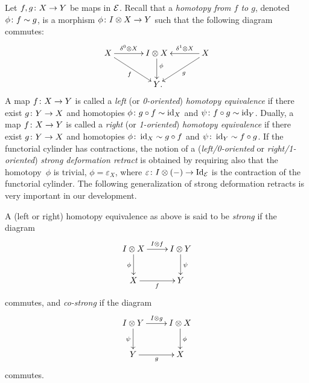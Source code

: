 \documentclass[reqno,10pt,a4paper,oneside,draft]{amsart}
\begin{document}
Let $f, g \colon X \to Y$ be maps in $\mathcal{E}$.
Recall that a \emph{homotopy from $f$ to $g$}, denoted $\phi \colon f \sim g$, is a morphism $\phi \colon I \otimes X \to Y$ such that the following diagram commutes:
\begin{equation} \label{equ:homotopy}
\begin{gathered}
\xymatrix@C=1.2cm{
  X
  \ar[r]^-{\lcyl \otimes X}
  \ar[dr]_{f}
&
  \interval \otimes X
  \ar[d]^(0.4){\phi}
&
  X
  \ar[dl]^{g}
  \ar[l]_-{\rcyl \otimes X}
\\&
  Y
\rlap{.}}
\end{gathered}
\end{equation}
A map $f \colon X \to Y$ is called a \emph{left} (or \emph{0-oriented}) \emph{homotopy equivalence} if there exist $g \colon Y \to X$ and homotopies $\phi \colon g \mathbin{\circ} f \sim \operatorname{id}_X $ and $\psi \colon f \mathbin{\circ} g \sim \operatorname{id}_Y$.
Dually, a map $f \colon X \to Y$ is called a \emph{right} (or \emph{1-oriented}) \emph{homotopy equivalence} if there exist $g \colon Y \to X$ and homotopies $\phi \colon \operatorname{id}_X \sim g \mathbin{\circ} f$ and $\psi \colon \operatorname{id}_Y \sim f \mathbin{\circ} g$.
If the functorial cylinder has contractions, the notion of a (\emph{left/0-oriented} or \emph{right/1-oriented}) \emph{strong deformation retract} is obtained by requiring also that the homotopy~$\phi$ is trivial, \ie $\phi = \varepsilon_X$, where $\varepsilon \colon I \otimes (-)
\to \operatorname{Id}_{\mathcal{E}}$ is the contraction of the functorial cylinder.
The following generalization of strong deformation retracts is very important in our development.

\begin{definition} \label{def:strhe}
A (left or right) homotopy equivalence as above is said to be \emph{strong} if the diagram
\[
\xymatrix{
  \interval \otimes X
  \ar[r]^{\interval \otimes f}
  \ar[d]_{\phi}
&
  \interval \otimes Y
  \ar[d]^{\psi}
\\
  X
  \ar[r]_{f}
&
  Y
}
\]
commutes, and \emph{co-strong} if the diagram
\[
\xymatrix{
  \interval \otimes Y
  \ar[r]^{\interval \otimes g}
  \ar[d]_{\psi}
&
  \interval \otimes X
  \ar[d]^{\phi}
\\
  Y
  \ar[r]_{g}
&
  X
}
\]
commutes.
\end{definition}
\end{document}
